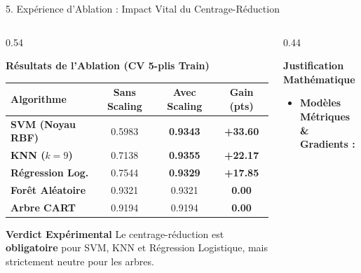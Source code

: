 \documentclass[aspectratio=169,10pt]{beamer}
\begin{document}
\begin{frame}{5. Expérience d'Ablation : Impact Vital du Centrage-Réduction}
    \begin{columns}[T]
        \begin{column}{0.54\textwidth}
            \begin{block}{\textbf{Résultats de l'Ablation (CV 5-plis Train)}}
                \centering
                \scriptsize
                \begin{tabular}{@{}lccc@{}}
                    \toprule
                    \textbf{Algorithme} & \textbf{Sans Scaling} & \textbf{Avec Scaling} & \textbf{Gain (pts)} \\
                    \midrule
                    \textbf{SVM (Noyau RBF)} & 0.5983 & \textbf{0.9343} & \textcolor{green!60!black}{\textbf{+33.60}} \\
                    \textbf{KNN ($k=9$)}      & 0.7138 & \textbf{0.9355} & \textcolor{green!60!black}{\textbf{+22.17}} \\
                    \textbf{Régression Log.} & 0.7544 & \textbf{0.9329} & \textcolor{green!60!black}{\textbf{+17.85}} \\
                    \textbf{Forêt Aléatoire} & 0.9321 & 0.9321 & \textbf{0.00} \\
                    \textbf{Arbre CART}      & 0.9194 & 0.9194 & \textbf{0.00} \\
                    \bottomrule
                \end{tabular}
            \end{block}
            \vspace{0.15cm}
            \begin{alertblock}{\textbf{Verdict Expérimental}}
                \footnotesize Le centrage-réduction est \textbf{obligatoire} pour SVM, KNN et Régression Logistique, mais strictement neutre pour les arbres.
            \end{alertblock}
        \end{column}
        \begin{column}{0.44\textwidth}
            \begin{block}{\textbf{Justification Mathématique}}
                \footnotesize
                \begin{itemize}
                    \item \textbf{Modèles Métriques \& Gradients :}

\end{itemize}
\end{block}
\end{column}
\end{columns}
\end{frame}
\end{document}
